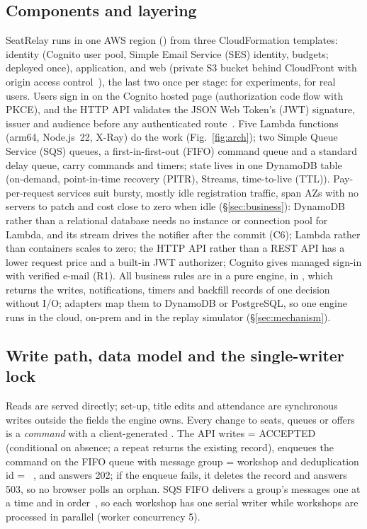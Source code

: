 \subsection{Components and layering}
SeatRelay runs in one AWS region () from three CloudFormation templates:
identity (Cognito user pool, Simple Email Service (SES) identity, budgets; deployed once),
application, and web (private S3 bucket behind CloudFront with origin access
control~\cite{aws-cloudfront-oac}), the last two once per stage:  for experiments,
 for real users. Users sign in on the Cognito hosted page (authorization code flow with
PKCE), and the HTTP API validates the JSON Web Token's (JWT) signature, issuer and audience before
any authenticated route~\cite{aws-apigw-jwt}. Five Lambda functions (arm64, Node.js~22, X-Ray) do the
work (Fig.~\ref{fig:arch}); two Simple Queue Service (SQS) queues, a first-in-first-out (FIFO)
command queue and a standard delay queue, carry commands and timers; state lives in one DynamoDB
table (on-demand, point-in-time recovery (PITR), Streams, time-to-live (TTL)). Pay-per-request
services suit bursty, mostly idle registration traffic, span AZs with no servers to patch and cost
close to zero when idle (\S\ref{sec:business}): DynamoDB rather than a relational database needs no
instance or connection pool for Lambda, and its stream drives the notifier after the commit (C6);
Lambda rather than containers scales to zero; the HTTP API rather than a REST API has a lower request
price and a built-in JWT authorizer; Cognito gives managed sign-in with verified e-mail (R1). All business rules are
in a pure engine,  in , which returns the
writes, notifications, timers and backfill records of one decision without I/O; adapters map them
to DynamoDB or PostgreSQL, so one engine runs in the cloud, on-prem and in the replay simulator
(\S\ref{sec:mechanism}).

\subsection{Write path, data model and the single-writer lock}\label{sec:writepath}
Reads are served directly; set-up, title edits and attendance are synchronous writes outside the
fields the engine owns.
Every change to seats, queues or offers is a \emph{command} with a client-generated
. The API writes  = ACCEPTED (conditional on absence; a
repeat returns the existing record), enqueues the command on the FIFO queue with message group =
workshop and deduplication id = ~\cite{aws-sqs-exactly-once}, and answers 202; if the
enqueue fails, it deletes the record and answers 503, so no browser polls an orphan. SQS FIFO
delivers a group's messages one at a time and in
order~\cite{aws-sqs-fifo,aws-sqs-fifo-terms,aws-lambda-sqs-scaling}, so each workshop has one serial
writer while workshops are processed in parallel (worker concurrency 5).

